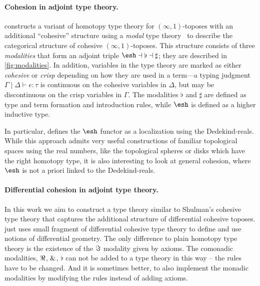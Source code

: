 \documentclass{article}
\begin{document}
\paragraph{Cohesion in adjoint type theory.}

\citet{Shulman2015} constructs a variant of homotopy type
theory for $(\infty,1)$-toposes with an additional ``cohesive'' structure using a \emph{modal}
type theory~\citep{Pfenning2001} to describe the categorical structure of
cohesive $(\infty,1)$-toposes. This structure consists of three
\emph{modalities}  that form an adjoint triple
$\shape \dashv \flat \dashv \sharp$; they are described in
\cref{fig:modalities}. In addition, variables in the type theory are marked as
either \emph{cohesive} or \emph{crisp} depending on how they are used in a
term---a typing judgment $\Gamma \mid \Delta \vdash e : \tau$ is continuous on
the cohesive variables in $\Delta$, but may be discontinuous on the crisp
variables in $\Gamma$. The modalities $\flat$ and $\sharp$ are defined as type
and term formation and introduction rules, while $\shape$ is defined as a higher
inductive type.

In particular, \citeauthor{Shulman2015} defines the $\shape$ functor as a
localization using the Dedekind-reals. While this approach admits very
useful constructions of familiar topological spaces using the real numbers, like
the topological spheres or disks which have the right homotopy type, it
is also interesting to look at general cohesion, where $\shape$ is not a priori
linked to the Dedekind-reals.

\paragraph{Differential cohesion in adjoint type theory.}

In this work we aim to construct a type theory similar to Shulman's cohesive
type theory that captures the additional structure of 
differential cohesive toposes. 
\citet{Wellen2017} just uses small fragment of differential cohesive type theory to
define and use notions of differential geometry. 
The only difference to plain homotopy type theory
 is the existence of the $\Im$ modality given by axioms.
The comonadic modalities, $\Re$, $\&$, $\flat$ can not be added to a type theory in this way -- 
the rules have to be changed.
And it is sometimes better, to also implement the monadic modalities by modifying the rules instead of adding axioms.
\end{document}
